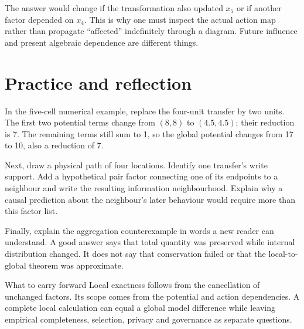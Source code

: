 The answer would change if the transformation also updated $x_5$ or if another factor depended on $x_4$. This is why one must inspect the actual action map rather than propagate ``affected'' indefinitely through a diagram. Future influence and present algebraic dependence are different things.

\section{Practice and reflection}
In the five-cell numerical example, replace the four-unit transfer by two units. The first two potential terms change from $(8,8)$ to $(4.5,4.5)$; their reduction is 7. The remaining terms still sum to 1, so the global potential changes from 17 to 10, also a reduction of 7.

Next, draw a physical path of four locations. Identify one transfer's write support. Add a hypothetical pair factor connecting one of its endpoints to a neighbour and write the resulting information neighbourhood. Explain why a causal prediction about the neighbour's later behaviour would require more than this factor list.

Finally, explain the aggregation counterexample in words a new reader can understand. A good answer says that total quantity was preserved while internal distribution changed. It does not say that conservation failed or that the local-to-global theorem was approximate.

\begin{intuitionbox}{What to carry forward}
Local exactness follows from the cancellation of unchanged factors. Its scope comes from the potential and action dependencies. A complete local calculation can equal a global model difference while leaving empirical completeness, selection, privacy and governance as separate questions.
\end{intuitionbox}

